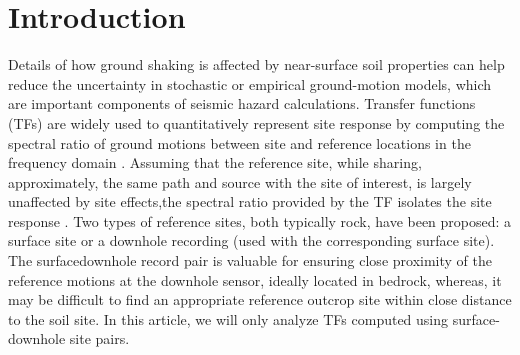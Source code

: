 \section{Introduction} \label{etf:intro}
Details of how ground shaking is affected by near-surface soil properties can help reduce the uncertainty in stochastic or empirical ground-motion models, which are important components of seismic hazard calculations. Transfer functions (TFs) are widely used to quantitatively represent site response by computing the spectral ratio of ground motions between site and reference locations in the frequency domain . Assuming that the reference site, while sharing, approximately, the same path and source with the site of interest, is largely unaffected by site effects,the spectral ratio provided by the TF isolates the site response \citep{borcherdtEffectsLocalGeology1970}. Two types of reference sites, both typically rock, have been proposed: a surface site or a downhole recording (used with the corresponding surface site). The surfacedownhole record pair is valuable for ensuring close proximity of the reference motions at the downhole sensor, ideally located in bedrock, whereas, it may be difficult to find an appropriate reference outcrop site within close distance to the soil site. In this article, we will only analyze TFs computed using surface-downhole site pairs.

